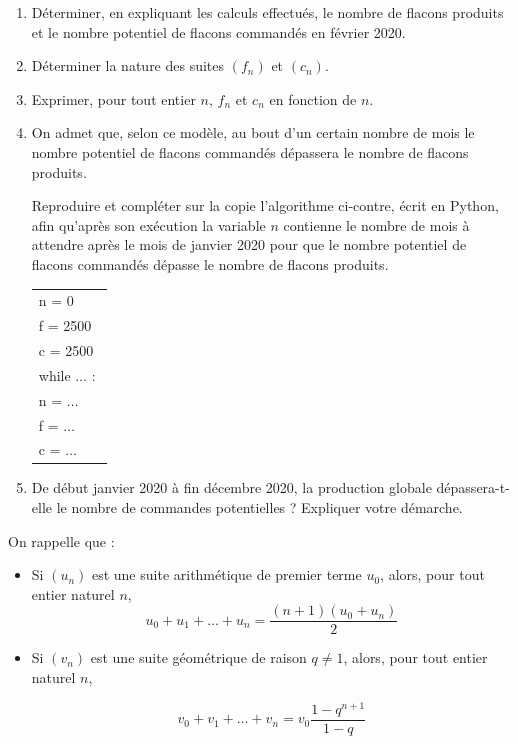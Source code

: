\documentclass[10pt]{article}
\providecommand{\np}[2][]{{#2~#1}}
\begin{document}
\begin{enumerate}
\item Déterminer, en expliquant les calculs effectués, le nombre de flacons produits et le nombre potentiel de flacons commandés en février 2020.
\item Déterminer la nature des suites $(f_n)$ et $(c_n)$.
\item Exprimer, pour tout entier $n$, $f_n$ et $c_n$ en fonction de $n$.
\item On admet que, selon ce modèle, au bout d’un certain nombre de mois le nombre potentiel de flacons commandés dépassera le nombre de flacons produits.

\begin{minipage}[b]{8.7 cm}
Reproduire et compléter sur la copie l’algorithme ci-contre, écrit en Python, afin qu’après son exécution la variable $n$ contienne le nombre de mois à attendre après le mois de janvier 2020 pour que le nombre potentiel de flacons commandés dépasse le nombre de flacons produits.
\end{minipage}\hspace{1.28cm}
\begin{minipage}[b]{4cm}
\begin{tabular}[]{|m{2.5cm}|}
\hline
n = 0\\
f = \np{2500}\\
c = \np{2500}\\
while $\dots$ :\\
\hspace{1.8em}n = $\dots$\\
\hspace{1.8em}f = $\dots$\\
\hspace{1.8em}c = $\dots$\\
\hline
\end{tabular}
\end{minipage}

\item De début janvier 2020 à fin décembre 2020, la production globale dépassera-t-elle le nombre de commandes potentielles ? Expliquer votre démarche.
\end{enumerate}

On rappelle que :
\begin{itemize}
\item Si $(u_n)$ est une suite arithmétique de premier terme $u_0$, alors, pour tout entier naturel $n$,
\[u_0+ u_1+\dots+u_n=\dfrac{(n+1)(u_0+u_n)}{2}\]
 \item Si $(v_n)$ est une suite géométrique de raison $q\not= 1$, alors, pour tout entier naturel $n$,
 
\[v_0+v_1+\dots+v_n=v_0\dfrac{1-q^{n+1}}{1-q}\] 
\end{itemize}
\end{document}
